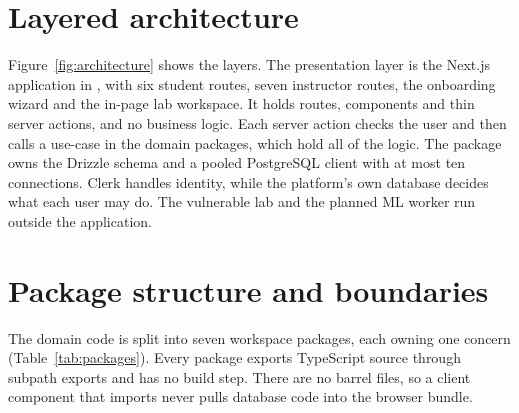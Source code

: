 \section{Layered architecture}

Figure~\ref{fig:architecture} shows the layers. The presentation layer is the Next.js application in , with six student routes, seven instructor routes, the onboarding wizard and the in-page lab workspace. It holds routes, components and thin server actions, and no business logic. Each server action checks the user and then calls a use-case in the domain packages, which hold all of the logic. The  package owns the Drizzle schema and a pooled PostgreSQL client with at most ten connections. Clerk handles identity, while the platform's own database decides what each user may do. The vulnerable lab and the planned ML worker run outside the application.


\section{Package structure and boundaries}

The domain code is split into seven workspace packages, each owning one concern (Table~\ref{tab:packages}). Every package exports TypeScript source through subpath exports and has no build step. There are no barrel files, so a client component that imports  never pulls database code into the browser bundle.

